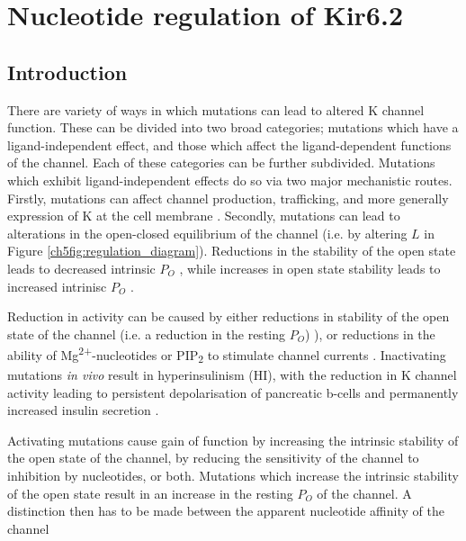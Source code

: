 \chapter{\label{ch:5}Nucleotide regulation of Kir6.2} 

\graphicspath{{figures/ch5/}}

\minitoc

\section{Introduction}

There are variety of ways in which mutations can lead to altered K\ATP{} channel function.
These can be divided into two broad categories; mutations which have a ligand-independent effect, and those which affect the ligand-dependent functions of the channel.
Each of these categories can be further subdivided.
Mutations which exhibit ligand-independent effects do so via two major mechanistic routes.
Firstly, mutations can affect channel production, trafficking, and more generally expression of K\ATP{} at the cell membrane \cite{thomas_mutation_1996, tornovsky_hyperinsulinism_2004, martin_pharmacological_2013}.
Secondly, mutations can lead to alterations in the open-closed equilibrium of the channel (i.e. by altering $L$ in Figure \ref{ch5fig:regulation_diagram}).
Reductions in the stability of the open state leads to decreased intrinsic $P_O$ \cite{shyng_membrane_1998, cartier_defective_2001, marthinet_severe_2005, lin_kir62_2006}, while increases in open state stability leads to increased intrinisc $P_O$ \cite{tucker_molecular_1998}.

Reduction in activity can be caused by either reductions in stability of the open state of the channel (i.e. a reduction in the resting $P_O$) \cite{shyng_membrane_1998}), or reductions in the ability of Mg\textsuperscript{2+}-nucleotides or PIP\textsubscript{2} to stimulate channel currents \cite{nichols_adenosine_1996, gribble_essential_1997-1, shyng_regulation_1997}.
Inactivating mutations \textit{in vivo} result in hyperinsulinism (HI), with the reduction in K\ATP{} channel activity leading to persistent depolarisation of pancreatic \textgreek{b}-cells and permanently increased insulin secretion \cite{nichols_k_2006, ashcroft_k_2013}.

Activating mutations cause gain of function by increasing the intrinsic stability of the open state of the channel, by reducing the sensitivity of the channel to inhibition by nucleotides, or both.
Mutations which increase the intrinsic stability of the open state result in an increase in the resting $P_O$ of the channel.
A distinction then has to be made between the apparent nucleotide affinity of the channel

